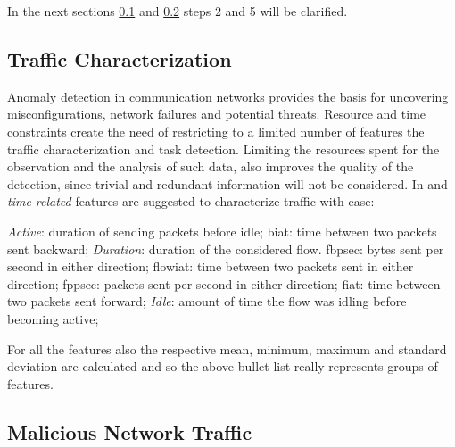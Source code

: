 \noindent In the next sections \ref{subsec:traffic-characterization} and \ref{subsec:malicious-traffic} steps 2 and 5 will be clarified.



\subsection{Traffic Characterization}
\label{subsec:traffic-characterization}

Anomaly detection in communication networks provides the basis for uncovering misconfigurations, network failures and potential threats. Resource and time constraints create the need of restricting to a limited number of features the traffic characterization and task detection. Limiting the resources spent for the observation and the analysis of such data, also improves the quality of the detection, since trivial and redundant information will not be considered. In \cite{icissp17} and \cite{icissp18} \textit{time-related} features are suggested to characterize traffic with ease:
\begin{itemize}
    \itemAR \textit{Active}: duration of sending packets before idle;
    \itemAR \gls{biat}: time between two packets sent backward;
    \itemAR \textit{Duration}: duration of the considered flow.
    \itemAR \gls{fbpsec}: bytes sent per second in either direction;
    \itemAR \gls{flowiat}: time between two packets sent in either direction; 
    \itemAR \gls{fppsec}: packets sent per second in either direction;
    \itemAR \gls{fiat}: time between two packets sent forward; 
    \itemAR \textit{Idle}: amount of time the flow was idling before becoming active;
\end{itemize}
For all the features also the respective mean, minimum, maximum and standard deviation are calculated and so the above bullet list really represents groups of features.


\subsection{Malicious Network Traffic}
\label{subsec:malicious-traffic}

